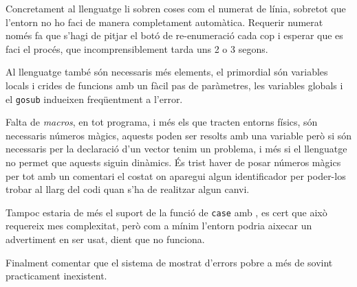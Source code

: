 Concretament al llenguatge li sobren coses com el numerat de línia,
sobretot que l'entorn no ho faci de manera completament automàtica.
Requerir numerat només fa que s'hagi de pitjar el botó de re-enumeració
cada cop i esperar que es faci el procés, que incomprensiblement tarda
uns 2 o 3 segons.

Al llenguatge també són necessaris més elements, el primordial són
variables locals i crides de funcions amb un fàcil pas de paràmetres,
les variables globals i el \texttt{gosub} indueixen freqüentment a l'error.

Falta de \emph{macros}, en tot programa, i més els que tracten entorns físics,
són necessaris números màgics, aquests poden ser resolts amb una variable
però si són necessaris per la declaració d'un vector tenim un problema,
i més si el llenguatge no permet que aquests siguin dinàmics. És
trist haver de posar números màgics per tot amb un comentari el costat
on aparegui algun identificador per poder-los trobar al llarg del codi
quan s'ha de realitzar algun canvi.

Tampoc estaria de més el suport de la funció de \texttt{case} amb ,
es cert que això requereix mes complexitat, però com a mínim l'entorn podria
aixecar un advertiment en ser usat, dient que no funciona.

Finalment comentar que el sistema de mostrat d'errors pobre a més de sovint
practicament inexistent.
